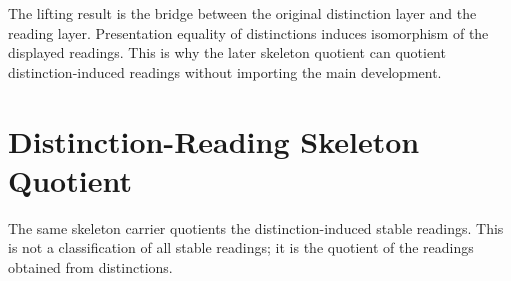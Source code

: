 \documentclass[11pt]{article}
\begin{document}
The lifting result is the bridge between the original distinction layer
and the reading layer.  Presentation equality of distinctions induces
isomorphism of the displayed readings.  This is why the later skeleton
quotient can quotient distinction-induced readings without importing the
main development.

\section{Distinction-Reading Skeleton Quotient}

The same skeleton carrier quotients the distinction-induced stable
readings.  This is not a classification of all stable readings; it is
the quotient of the readings obtained from distinctions.

\begin{code}%
\>[0]\<%
\\
\>[0]\AgdaSpace{}%
\AgdaSpace{}%
\AgdaSymbol{:}\AgdaSpace{}%
\AgdaSpace{}%
\<%
\\
\>[0][@{}l@{\AgdaIndent{0}}]%
\>[2]\<%
\\
\>[2][@{}l@{\AgdaIndent{0}}]%
\>[4]%
\>[19]\AgdaSymbol{:}\AgdaSpace{}%
\<%
\\
%
\>[4]%
\>[19]\AgdaSymbol{:}\AgdaSpace{}%
\AgdaSpace{}%
\AgdaSpace{}%
\AgdaSpace{}%
\<%
\\
%
\>[4]%
\>[19]\AgdaSymbol{:}\AgdaSpace{}%
\AgdaSpace{}%
\AgdaSpace{}%
\<%
\\
%
\>[4]\AgdaSpace{}%
\AgdaSymbol{:}\AgdaSpace{}%
\<%
\\
%
\>[4]%
\>[19]\AgdaSymbol{:}%
\>[2376I]\AgdaSymbol{(}\AgdaSpace{}%
\AgdaSpace{}%
\AgdaSymbol{:}\AgdaSpace{}%
\AgdaSymbol{)}\AgdaSpace{}%
\<%
\\
\>[.][@{}l@{}]\<[2376I]%
\>[21]\AgdaSpace{}%
\AgdaSpace{}%
\AgdaSymbol{(}\AgdaSpace{}%
\AgdaSymbol{)}\AgdaSpace{}%

\end{code}
\end{document}
